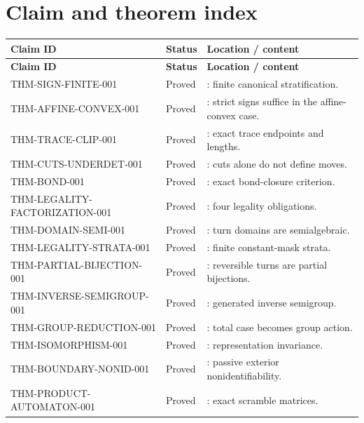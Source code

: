 \documentclass[11pt,openany]{book}
\theoremstyle{polyplain}
\theoremstyle{polydef}
\begin{document}
\chapter{Claim and theorem index}

\small
\begin{longtable}{L{0.25\textwidth}L{0.15\textwidth}L{0.50\textwidth}}
\toprule
\textbf{Claim ID} & \textbf{Status} & \textbf{Location / content}\\
\midrule
\endfirsthead
\toprule
\textbf{Claim ID} & \textbf{Status} & \textbf{Location / content}\\
\midrule
\endhead
THM-SIGN-FINITE-001 & Proved & : finite canonical stratification.\\
THM-AFFINE-CONVEX-001 & Proved & : strict signs suffice in the affine-convex case.\\
THM-TRACE-CLIP-001 & Proved & : exact trace endpoints and lengths.\\
THM-CUTS-UNDERDET-001 & Proved & : cuts alone do not define moves.\\
THM-BOND-001 & Proved & : exact bond-closure criterion.\\
THM-LEGALITY-FACTORIZATION-001 & Proved & : four legality obligations.\\
THM-DOMAIN-SEMI-001 & Proved & : turn domains are semialgebraic.\\
THM-LEGALITY-STRATA-001 & Proved & : finite constant-mask strata.\\
THM-PARTIAL-BIJECTION-001 & Proved & : reversible turns are partial bijections.\\
THM-INVERSE-SEMIGROUP-001 & Proved & : generated inverse semigroup.\\
THM-GROUP-REDUCTION-001 & Proved & : total case becomes group action.\\
THM-ISOMORPHISM-001 & Proved & : representation invariance.\\
THM-BOUNDARY-NONID-001 & Proved & : passive exterior nonidentifiability.\\
THM-PRODUCT-AUTOMATON-001 & Proved & : exact scramble matrices.\\

\end{longtable}
\end{document}
